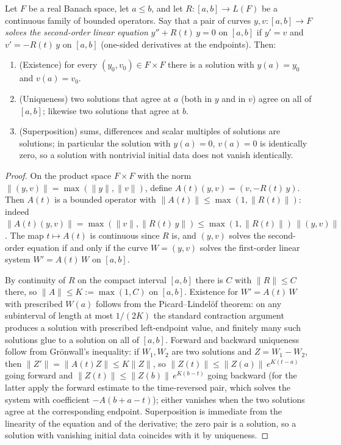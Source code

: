 \begin{lemma}
\label{lem:second-order-linear-ode}
\leanok
Let $F$ be a real Banach space, let $a\le b$, and let
$R\colon[a,b]\to L(F)$ be a continuous family of bounded operators.
Say that a pair of curves $y,v\colon[a,b]\to F$ {\em solves the
second-order linear equation} $y''+R(t)\,y=0$ on $[a,b]$ if $y'=v$
and $v'=-R(t)\,y$ on $[a,b]$ (one-sided derivatives at the
endpoints). Then:
\begin{enumerate}
\item (Existence) for every $(y_0,v_0)\in F\times F$ there is a
solution with $y(a)=y_0$ and $v(a)=v_0$.
\item (Uniqueness) two solutions that agree at $a$ (both in $y$ and
in $v$) agree on all of $[a,b]$; likewise two solutions that agree
at $b$.
\item (Superposition) sums, differences and scalar multiples of
solutions are solutions; in particular the solution with $y(a)=0$,
$v(a)=0$ is identically zero, so a solution with nontrivial initial
data does not vanish identically.
\end{enumerate}
\end{lemma}

\begin{proof}
\leanok
On the product space $F\times F$ with the norm
$\|(y,v)\|=\max(\|y\|,\|v\|)$, define $A(t)(y,v)=(v,-R(t)\,y)$. Then
$A(t)$ is a bounded operator with $\|A(t)\|\le\max(1,\|R(t)\|)$:
indeed
$\|A(t)(y,v)\|=\max(\|v\|,\|R(t)\,y\|)
\le\max(1,\|R(t)\|)\,\|(y,v)\|$. The map $t\mapsto A(t)$ is
continuous since $R$ is, and $(y,v)$ solves the second-order
equation if and only if the curve $W=(y,v)$ solves the first-order
linear system $W'=A(t)\,W$ on $[a,b]$.

By continuity of $R$ on the compact interval $[a,b]$ there is $C$
with $\|R\|\le C$ there, so $\|A\|\le K:=\max(1,C)$ on $[a,b]$.
Existence for $W'=A(t)\,W$ with prescribed $W(a)$ follows from the
Picard--Lindel\"of theorem: on any subinterval of length at most
$1/(2K)$ the standard contraction argument produces a solution with
prescribed left-endpoint value, and finitely many such solutions
glue to a solution on all of $[a,b]$. Forward and backward
uniqueness follow from Gr\"onwall's inequality: if $W_1,W_2$ are
two solutions and $Z=W_1-W_2$, then $\|Z'\|=\|A(t)Z\|\le K\|Z\|$,
so $\|Z(t)\|\le\|Z(a)\|\,e^{K(t-a)}$ going forward and
$\|Z(t)\|\le\|Z(b)\|\,e^{K(b-t)}$ going backward (for the latter
apply the forward estimate to the time-reversed pair, which solves
the system with coefficient $-A(b+a-t)$); either vanishes when the
two solutions agree at the corresponding endpoint. Superposition is
immediate from the linearity of the equation and of the derivative;
the zero pair is a solution, so a solution with vanishing initial
data coincides with it by uniqueness.
\end{proof}

